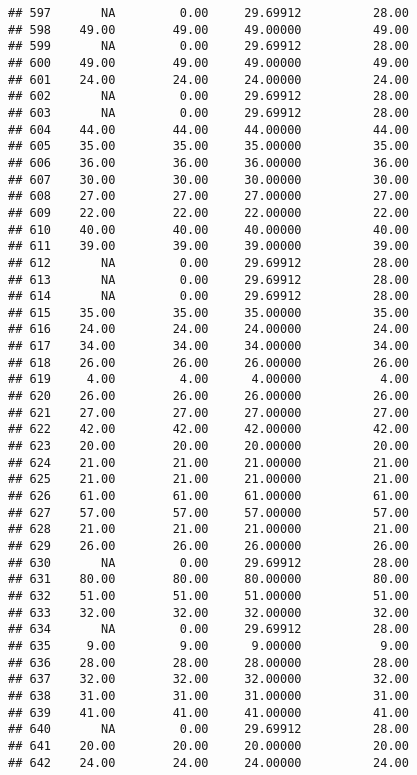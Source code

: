\documentclass[
]{article}
\begin{document}
\begin{verbatim}
## 597       NA         0.00     29.69912          28.00
## 598    49.00        49.00     49.00000          49.00
## 599       NA         0.00     29.69912          28.00
## 600    49.00        49.00     49.00000          49.00
## 601    24.00        24.00     24.00000          24.00
## 602       NA         0.00     29.69912          28.00
## 603       NA         0.00     29.69912          28.00
## 604    44.00        44.00     44.00000          44.00
## 605    35.00        35.00     35.00000          35.00
## 606    36.00        36.00     36.00000          36.00
## 607    30.00        30.00     30.00000          30.00
## 608    27.00        27.00     27.00000          27.00
## 609    22.00        22.00     22.00000          22.00
## 610    40.00        40.00     40.00000          40.00
## 611    39.00        39.00     39.00000          39.00
## 612       NA         0.00     29.69912          28.00
## 613       NA         0.00     29.69912          28.00
## 614       NA         0.00     29.69912          28.00
## 615    35.00        35.00     35.00000          35.00
## 616    24.00        24.00     24.00000          24.00
## 617    34.00        34.00     34.00000          34.00
## 618    26.00        26.00     26.00000          26.00
## 619     4.00         4.00      4.00000           4.00
## 620    26.00        26.00     26.00000          26.00
## 621    27.00        27.00     27.00000          27.00
## 622    42.00        42.00     42.00000          42.00
## 623    20.00        20.00     20.00000          20.00
## 624    21.00        21.00     21.00000          21.00
## 625    21.00        21.00     21.00000          21.00
## 626    61.00        61.00     61.00000          61.00
## 627    57.00        57.00     57.00000          57.00
## 628    21.00        21.00     21.00000          21.00
## 629    26.00        26.00     26.00000          26.00
## 630       NA         0.00     29.69912          28.00
## 631    80.00        80.00     80.00000          80.00
## 632    51.00        51.00     51.00000          51.00
## 633    32.00        32.00     32.00000          32.00
## 634       NA         0.00     29.69912          28.00
## 635     9.00         9.00      9.00000           9.00
## 636    28.00        28.00     28.00000          28.00
## 637    32.00        32.00     32.00000          32.00
## 638    31.00        31.00     31.00000          31.00
## 639    41.00        41.00     41.00000          41.00
## 640       NA         0.00     29.69912          28.00
## 641    20.00        20.00     20.00000          20.00
## 642    24.00        24.00     24.00000          24.00

\end{verbatim}
\end{document}
